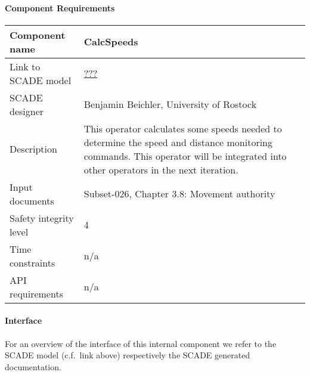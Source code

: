 
\paragraph{Component Requirements}

\begin{longtable}{p{}p{}}
\toprule
Component name			& CalcSpeeds \\
\midrule
Link to SCADE model		& {\footnotesize \url{???}} \\
\midrule
SCADE designer			& Benjamin Beichler, University of Rostock \\
\midrule
Description				& This operator calculates some speeds needed to determine the speed and distance monitoring commands. This operator will be integrated into other operators in the next iteration.\\
\midrule
Input documents	& 
Subset-026, Chapter 3.8: Movement authority \\
\midrule
Safety integrity level		& 4 \\
\midrule
Time constraints		& n/a \\
\midrule
API requirements 		& n/a \\
\bottomrule
\end{longtable}


\paragraph{Interface}

For an overview of the interface of this internal component we refer to the SCADE model (c.f.~link above) respectively the SCADE generated documentation.